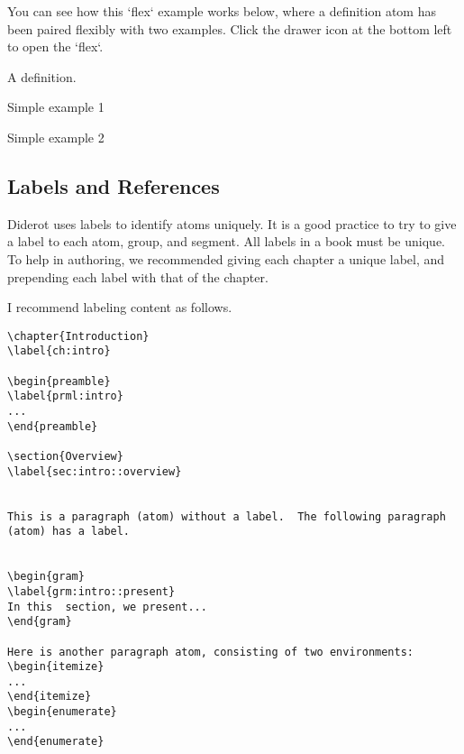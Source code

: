 You can see how this `flex` example works below, where a definition atom
has been paired flexibly with two examples.  Click the drawer icon
at the bottom left to open the `flex`.


\begin{flex}
\begin{definition}[A Definition]
\label{def:a}
A definition.
\end{definition}

\begin{example}
\label{ex:simple-1}
Simple example 1
\end{example}

\begin{example}
\label{ex:simple-2}
Simple example 2
\end{example}

\end{flex}
  

\subsection{Labels and References}

Diderot uses labels to identify atoms uniquely.  It is a good practice
to try to give a label to each atom, group, and segment.  All labels
in a book must be unique.  To help in authoring, we recommended giving
each chapter a unique label, and prepending each label with that of
the chapter.


\begin{example}

I recommend labeling content as follows.

\begin{lstlisting}
\chapter{Introduction}
\label{ch:intro}

\begin{preamble}
\label{prml:intro}
...
\end{preamble}

\section{Overview}
\label{sec:intro::overview}


This is a paragraph (atom) without a label.  The following paragraph (atom) has a label.


\begin{gram}
\label{grm:intro::present}
In this  section, we present...
\end{gram}

Here is another paragraph atom, consisting of two environments:
\begin{itemize}
...
\end{itemize}
\begin{enumerate}
...
\end{enumerate}

\end{lstlisting}
\end{example}

